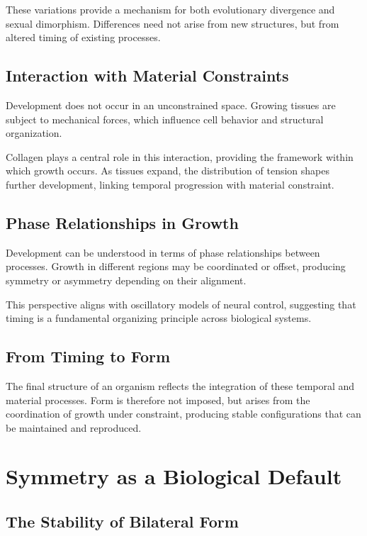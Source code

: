 \documentclass[11pt,oneside]{book}
\begin{document}
These variations provide a mechanism for both evolutionary divergence and sexual dimorphism. Differences need not arise from new structures, but from altered timing of existing processes.

\section{Interaction with Material Constraints}

Development does not occur in an unconstrained space. Growing tissues are subject to mechanical forces, which influence cell behavior and structural organization.

Collagen plays a central role in this interaction, providing the framework within which growth occurs. As tissues expand, the distribution of tension shapes further development, linking temporal progression with material constraint.

\section{Phase Relationships in Growth}

Development can be understood in terms of phase relationships between processes. Growth in different regions may be coordinated or offset, producing symmetry or asymmetry depending on their alignment.

This perspective aligns with oscillatory models of neural control, suggesting that timing is a fundamental organizing principle across biological systems.

\section{From Timing to Form}

The final structure of an organism reflects the integration of these temporal and material processes. Form is therefore not imposed, but arises from the coordination of growth under constraint, producing stable configurations that can be maintained and reproduced.

\chapter{Symmetry as a Biological Default}

\section{The Stability of Bilateral Form}
\end{document}
